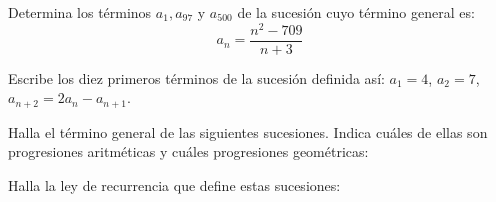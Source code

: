 \documentclass[12pt]{exam}
\begin{document}
\begin{questions}

\question Determina los términos \( a_1, a_{97} \) y \( a_{500} \) de la sucesión cuyo término general es:
\[
a_n = \frac{n^2 - 709}{n + 3}
\]

\question Escribe los diez primeros términos de la sucesión definida así: \( a_1 = 4 \), \( a_2 = 7 \), \( a_{n+2} = 2a_{n} - a_{n+1} \).

\question Halla el término general de las siguientes sucesiones. Indica cuáles de ellas son progresiones aritméticas y cuáles progresiones geométricas:

\question Halla la ley de recurrencia que define estas sucesiones:
\end{questions}
\end{document}
